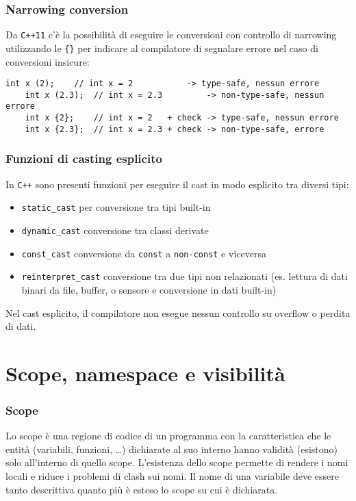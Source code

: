 \documentclass[a4paper]{article}
\newcommand{\cpp}{\texttt{C++} } %
\newcommand{\cppel}{\texttt{C++11} } %
\begin{document}
\subsubsection*{Narrowing conversion}
Da \cppel c'è la possibilità di eseguire le conversioni con controllo di narrowing utilizzando le \verb|{}| per indicare al
compilatore di segnalare errore nel caso di conversioni insicure:
\begin{lstlisting}[numbers=none]
	int x (2);    // int x = 2           -> type-safe, nessun errore
	int x (2.3);  // int x = 2.3         -> non-type-safe, nessun errore
	int x {2};    // int x = 2   + check -> type-safe, nessun errore
	int x {2.3};  // int x = 2.3 + check -> non-type-safe, errore
\end{lstlisting}

\subsubsection*{Funzioni di casting esplicito}
In \cpp sono presenti funzioni per eseguire il cast in modo esplicito tra diversi tipi:
\begin{itemize}
	\item \verb|static_cast| per conversione tra tipi built-in
	\item \verb|dynamic_cast| conversione tra classi derivate
	\item \verb|const_cast| conversione da \verb|const| a \verb|non-const| e viceversa
	\item \verb|reinterpret_cast| conversione tra due tipi non relazionati (es. lettura di dati binari da file, buffer, o
	sensore e conversione in dati built-in)
\end{itemize}
Nel cast esplicito, il compilatore non esegue nessun controllo su overflow o perdita di dati.

\newpage

\section{Scope, namespace e visibilità}
\subsubsection*{Scope}
Lo scope è una regione di codice di un programma con la caratteristica che le entità (variabili, funzioni, \dots) dichiarate al
suo interno hanno validità (esistono) solo all'interno di quello scope. L'esistenza dello scope permette di rendere i nomi locali
e riduce i problemi di clash sui nomi. Il nome di una variabile deve essere tanto descrittiva quanto più è esteso lo scope su
cui è dichiarata.
\end{document}

